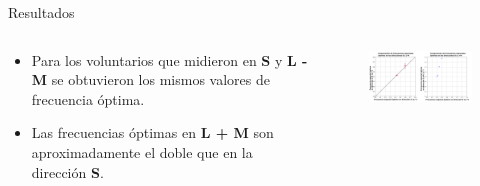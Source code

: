 \documentclass[
    11pt, %
    aspectratio=169, %
]{beamer}
\begin{document}
\begin{frame}{Resultados}
    \begin{columns}[c] %

    
		\begin{column}{0.40\textwidth}

   \begin{itemize}
        \item Para los voluntarios que midieron en $\mathbf{S}$ y \textbf{L - M} se obtuvieron los mismos valores de frecuencia óptima.
        \item Las frecuencias óptimas en \textbf{L + M} son aproximadamente el doble que en la dirección \textbf{S}.
      
    \end{itemize}

                
		\end{column}
  		\begin{column}{0.60\textwidth} %
                 \begin{figure}[h!]
                    \centering
                    \includegraphics[angle=0, width=8.5cm]{Images/resultados/comparaciones_ar1_def.pdf}
               \end{figure}
		\end{column}		
	\end{columns}
\end{frame}
\end{document}
